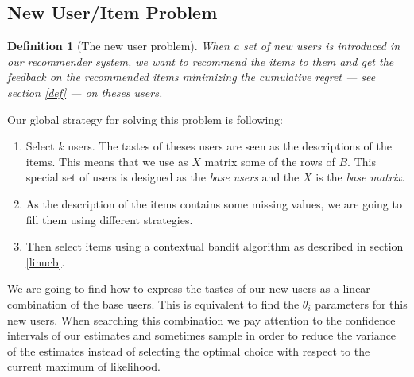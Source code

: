 \documentclass[twoside,leqno,twocolumn]{article}
\newtheorem{mydef}{Definition}
\newcommand{\jm}[1]{{\color{TealBlue}(jm) #1\color{black}}}
\newcommand{\hai}[1]{\color{blue}(hai) #1\color{black}}
\begin{document}
\subsection{New User/Item Problem}
\label{prob}





\begin{mydef}[The new user problem]
When a set of new users is introduced in our recommender system, we want to recommend the items to them and get the feedback on the recommended items minimizing the cumulative regret --- see section \ref{def} --- on theses users. %
\end{mydef}


Our global strategy for solving this problem is following:
\begin{enumerate}
	\item Select $k$ users. The tastes of theses users are seen as the descriptions of the items. This means that we use as $X$ matrix some of the rows of $B$. This special set of users is designed as the \emph{base users} and the $X$ is the \emph{base matrix}.
	\item As the description of the items contains some missing values, we are going to fill them using different strategies.
	\item Then select items using a contextual bandit algorithm as described in section \ref{linucb}. 
\end{enumerate}
We are going to find how to express the tastes of our new users as a linear combination of the base users. This is equivalent to find the $\theta_i$ parameters for this new users. When searching this combination we pay attention to the confidence intervals of our estimates and sometimes sample in order to reduce the variance of the estimates instead of selecting the optimal choice with respect to the current maximum of likelihood. 
\end{document}
